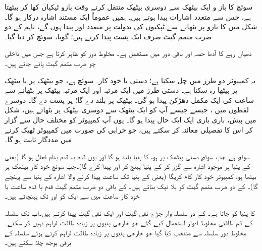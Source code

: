سوئچ کا باز و ایک بیٹھک سے دوسری  بیٹھک منتقل کرتے وقت  بازو  ٹپکیاں کھا کر بیٹھتا ہے، جس سے متعدد اشارات پیدا ہوتے  ہیں۔ ہمیں عموماً ایک مستند  اشارہ درکار ہو گا۔ شکل  میں   کا بازو   پر  بٹھانے سے ٹپکیوں کی بدولت   پر متعدد  اور      پیدا ہوں گے، تاہم  کے دو ضرب متمم گیٹ صرف ایک  پست  پیدا کرتے ہیں؛ گویا،  سوئچ  کر دیا  گیا۔

دھیان رہے  کا آدھا حصہ   اور باقی    دور میں  مستعمل ہے۔    مخلوط  دور    کو ظاہر کرتا ہے جس میں    داخلی  چو ضرب  متمم  گیٹ  پائے جاتے ہیں۔

یہ کمپیوٹر دو  طرز  میں چل سکتا ہے؛ دستی   یا خود کار۔ سوئچ ہے، جو  بیٹھک پر یا   بیٹھک پر بیٹھا  رہ سکتا ہے۔  دستی طرز میں   ایک مرتبہ    اور ایک  مرتبہ    بیٹھک  پر  بٹھانے  سے  ساعت کی  ایک مکمل   دھڑکن پیدا ہو گی۔  بیٹھک پر  بلند  دے گا؛   پر  پست  دے گا۔ دوسرے لفظوں میں ، جیسے جیسے آپ  کو ایک بیٹھک سے دوسری بیٹھک پر     بٹھاتے ہیں، شکل   میں پیش،   باری باری ایک ایک  حال پیدا ہو گا۔ یوں آپ  کمپیوٹر  کو  مختلف  حال سے گزار کر اس کا تفصیلی معائنہ  کر سکتے ہیں، جو  خرابی کی صورت میں کمپیوٹر ٹھیک کرنے میں مددگار ثابت ہو گا۔

 سوئچ  ہے۔جب سوئچ  دستی بیٹھک پر  ہو،  کا پنیا  بلند ہو گا اور یوں  قدم بہ قدم بتام فعال ہو گا  (یعنی  کے پنیا   پر موجود اشارہ  سے گزر کر  کے پنیا  پہنچ کر   اور  پیدا کرے گا)۔جب سوئچ  خود کار بیٹھک پر  بیٹھا ہو، کمپیوٹر خود کار  کام کریگا   (یعنی  کے پنیا  تک   ساعت پیدا کرنے والا   اشارہ   کے پنیا سے پہنچے گا)۔  کے دو ضرب متمم گیٹ  کو بلا ٹپک بناتے ہیں۔ کے باقی دو  ضرب متمم گیٹ  قدم  با قدم ساعت یا خود کار ساعت  میں سے ایک کو  اور  تک پہنچاتے ہیں۔

 کا پنیا   کو  جاتا ہے۔ کے  دو سلسلہ وار جڑے نفی گیٹ  اور  ایک نفی گیٹ  پیدا کرتے ہیں۔اب  تک   سلسلہ کے کم طاقتی  مخلوط ادوار استعمال کیے گئے  جو  خارجی پنیوں پر زیادہ طاقت فراہم نہیں کر سکتے۔   مخلوط دور  سلسلہ سے منتخب کیا گیا  جو  خارجی پنیوں پر زیادہ طاقت  فراہم  کرتے ہوئے  سلسلہ کے  برقی بوجھ چلا سکتے  ہیں۔

